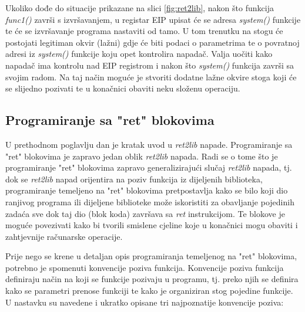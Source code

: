 \documentclass[times, utf8, diplomski, numeric]{fer}
\begin{document}
Ukoliko dođe do situacije prikazane na slici \ref{fig:ret2lib},
nakon što funkcija \emph{func1()} završi s izvršavanjem, u
registar EIP upisat će se adresa \emph{system()} funkcije te će
se izvršavanje programa nastaviti od tamo. U tom trenutku na
stogu će postojati legitiman okvir (lažni) gdje će biti podaci o
parametrima te o povratnoj adresi iz \emph{system()} funkcije
koju opet kontrolira napadač. Valja uočiti kako napadač ima
kontrolu nad EIP registrom i nakon što \emph{system()} funkcija
završi sa svojim radom. Na taj način moguće je stvoriti dodatne
lažne okvire stoga koji će se slijedno pozivati te u konačnici
obaviti neku složenu operaciju. 

\subsection{Programiranje sa "ret" blokovima}
\label{sct:rop2}

U prethodnom poglavlju dan je kratak uvod u \emph{ret2lib}
napade. Programiranje sa "ret" blokovima je zapravo jedan oblik
\emph{ret2lib} napada. Radi se o tome što je programiranje "ret"
blokovima zapravo generalizirajući slučaj \emph{ret2lib} napada,
tj. dok se \emph{ret2lib} napad orijentira na poziv funkcija iz
dijeljenih biblioteka, programiranje temeljeno na "ret" blokovima
pretpostavlja kako se bilo koji dio ranjivog programa ili
dijeljene biblioteke može iskoristiti za obavljanje pojedinih
zadaća sve dok taj dio (blok koda) završava sa \emph{ret}
instrukcijom. Te blokove je moguće povezivati kako bi tvorili
smislene cjeline koje u konačnici mogu obaviti i zahtjevnije
računarske operacije.

Prije nego se krene u detaljan opis programiranja temeljenog na
"ret" blokovima, potrebno  je spomenuti konvencije poziva
funkcija. Konvencije poziva funkcija definiraju način na koji se
funkcije pozivaju u programu, tj. preko njih se definira kako se
parametri prenose funkciji te kako je organiziran stog pojedine
funkcije. U nastavku su navedene i ukratko opisane tri
najpoznatije konvencije poziva:
\end{document}
